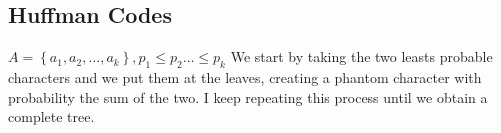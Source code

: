     \subsection*{Huffman Codes}
    $A = \left\{ a_1, a_2, \ldots, a_k \right\}, p_1\leq p_2 \ldots \leq p_k$
    We start by taking the two leasts probable characters and we put them at the leaves, creating a phantom character with probability
    the sum of the two. I keep repeating this process until we obtain a complete tree.

